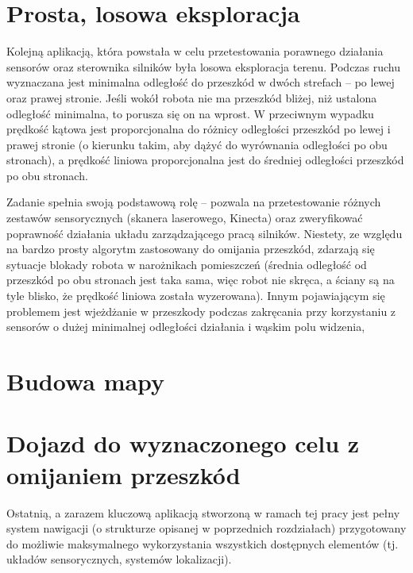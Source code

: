 \section{Prosta, losowa eksploracja}

Kolejną aplikacją, która powstała w celu przetestowania porawnego działania 
sensorów oraz sterownika silników była losowa eksploracja terenu. Podczas 
ruchu wyznaczana jest minimalna odległość do przeszkód w dwóch strefach 
-- po lewej oraz prawej stronie. Jeśli wokół robota nie ma przeszkód bliżej, 
niż ustalona odległość minimalna, to porusza się on na wprost. W przeciwnym
wypadku prędkość kątowa jest proporcjonalna do różnicy odległości przeszkód
po lewej i prawej stronie (o kierunku takim, aby dążyć do wyrównania odległości
po obu stronach), a prędkość liniowa proporcjonalna jest do średniej odległości
przeszkód po obu stronach.

Zadanie spełnia swoją podstawową rolę -- pozwala na przetestowanie różnych 
zestawów sensorycznych (skanera laserowego, Kinecta) oraz zweryfikować
poprawność działania układu zarządzającego pracą silników. Niestety, ze względu
na bardzo prosty algorytm zastosowany do omijania przeszkód, zdarzają się sytuacje
blokady robota w narożnikach pomieszczeń (średnia odległość od przeszkód po 
obu stronach jest taka sama, więc robot nie skręca, a ściany są na tyle blisko, 
że prędkość liniowa została wyzerowana). Innym pojawiającym się problemem
jest wjeżdżanie w przeszkody podczas zakręcania przy korzystaniu z sensorów 
o dużej minimalnej odległości działania i wąskim polu widzenia, 



\section{Budowa mapy}



\section{Dojazd do wyznaczonego celu z omijaniem przeszkód}

Ostatnią, a zarazem kluczową aplikacją stworzoną w ramach tej pracy jest
pełny system nawigacji (o strukturze opisanej w poprzednich rozdziałach)
przygotowany do możliwie maksymalnego wykorzystania wszystkich dostępnych
elementów (tj. układów sensorycznych, systemów lokalizacji).
